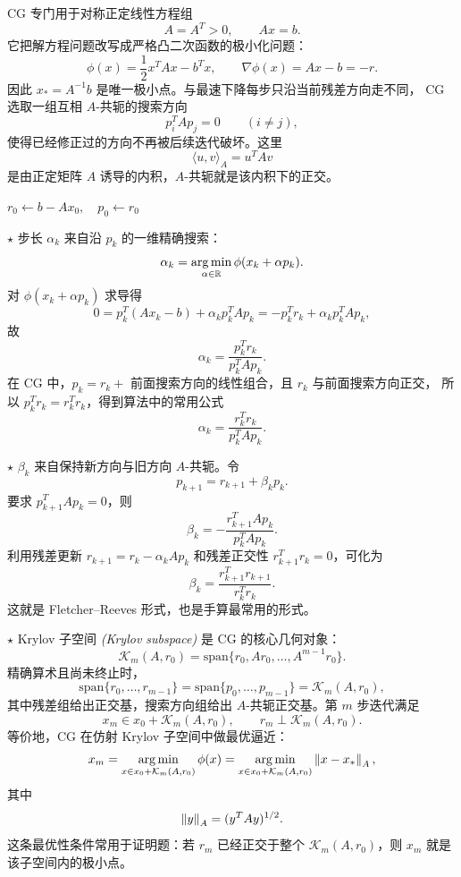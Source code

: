 \documentclass{article}
\newcommand{\argmin}{\operatorname*{arg\,min}}
\newcommand{\keypoint}{\textcolor{red!65!black}{\textbf{$\star$}}}
\newcommand{\eng}[1]{\texorpdfstring{{\normalfont\rmfamily\itshape\textcolor{blue!65!black}{(#1)}}}{(#1)}}
\begin{document}
CG 专门用于对称正定线性方程组
\[
  A=A^T>0,\qquad Ax=b.
\]
它把解方程问题改写成严格凸二次函数的极小化问题：
\[
  \phi(x)=\frac12x^TAx-b^Tx,\qquad \nabla\phi(x)=Ax-b=-r.
\]
因此 $x_*=A^{-1}b$ 是唯一极小点。与最速下降每步只沿当前残差方向走不同，
CG 选取一组互相 $A$-共轭的搜索方向
\[
  p_i^TAp_j=0\qquad(i\ne j),
\]
使得已经修正过的方向不再被后续迭代破坏。这里
\[
  \langle u,v\rangle_A=u^TAv
\]
是由正定矩阵 $A$ 诱导的内积，$A$-共轭就是该内积下的正交。

\begin{algorithm}[H]
  \caption{共轭梯度法（CG）\eng{Conjugate Gradient Method}}
  $r_0\leftarrow b-Ax_0,\quad p_0\leftarrow r_0$\;
\end{algorithm}

\keypoint{} 步长 $\alpha_k$ 来自沿 $p_k$ 的一维精确搜索：
\[
  \alpha_k=\argmin_{\alpha\in\R}\phi(x_k+\alpha p_k).
\]
对 $\phi(x_k+\alpha p_k)$ 求导得
\[
  0=p_k^T(Ax_k-b)+\alpha_k p_k^TAp_k
  =-p_k^Tr_k+\alpha_kp_k^TAp_k,
\]
故
\[
  \alpha_k=\frac{p_k^Tr_k}{p_k^TAp_k}.
\]
在 CG 中，$p_k=r_k+$ 前面搜索方向的线性组合，且 $r_k$ 与前面搜索方向正交，
所以 $p_k^Tr_k=r_k^Tr_k$，得到算法中的常用公式
\[
  \alpha_k=\frac{r_k^Tr_k}{p_k^TAp_k}.
\]

\keypoint{} $\beta_k$ 来自保持新方向与旧方向 $A$-共轭。令
\[
  p_{k+1}=r_{k+1}+\beta_kp_k.
\]
要求 $p_{k+1}^TAp_k=0$，则
\[
  \beta_k=-\frac{r_{k+1}^TAp_k}{p_k^TAp_k}.
\]
利用残差更新 $r_{k+1}=r_k-\alpha_kAp_k$ 和残差正交性
$r_{k+1}^Tr_k=0$，可化为
\[
  \beta_k=\frac{r_{k+1}^Tr_{k+1}}{r_k^Tr_k}.
\]
这就是 Fletcher--Reeves 形式，也是手算最常用的形式。

\keypoint{} Krylov 子空间 \eng{Krylov subspace} 是 CG 的核心几何对象：
\[
  \mathcal K_m(A,r_0)
  =\mathrm{span}\{r_0,Ar_0,\dots,A^{m-1}r_0\}.
\]
精确算术且尚未终止时，
\[
  \mathrm{span}\{r_0,\dots,r_{m-1}\}
  =\mathrm{span}\{p_0,\dots,p_{m-1}\}
  =\mathcal K_m(A,r_0),
\]
其中残差组给出正交基，搜索方向组给出 $A$-共轭正交基。第 $m$ 步迭代满足
\[
  x_m\in x_0+\mathcal K_m(A,r_0),\qquad
  r_m\perp \mathcal K_m(A,r_0).
\]
等价地，CG 在仿射 Krylov 子空间中做最优逼近：
\[
  x_m=\argmin_{x\in x_0+\mathcal K_m(A,r_0)}\phi(x)
  =\argmin_{x\in x_0+\mathcal K_m(A,r_0)}\norm{x-x_*}_A,
\]
其中
\[
  \left\| y \right\|_A=(y^TAy)^{1/2}.
\]
这条最优性条件常用于证明题：若 $r_m$ 已经正交于整个
$\mathcal K_m(A,r_0)$，则 $x_m$ 就是该子空间内的极小点。
\end{document}
